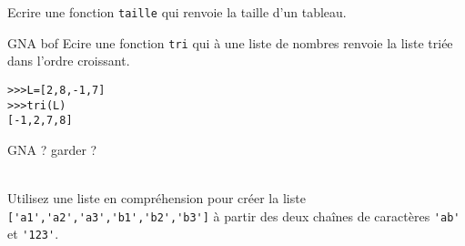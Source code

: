 \begin{exercice}
Ecrire une fonction \verb?taille? qui renvoie la taille d'un tableau.
\end{exercice}



\begin{exercice}GNA bof
Ecire une fonction \verb?tri? qui \` a une liste de nombres renvoie la liste triée dans l'ordre croissant.
\begin{verbatim}
>>>L=[2,8,-1,7]
>>>tri(L)
[-1,2,7,8]
\end{verbatim}

\end{exercice}



GNA ? garder ?
\begin{exercice}~\\
Utilisez une liste en compréhension pour créer la liste \verb?['a1','a2','a3','b1','b2','b3']? \` a partir des deux cha\^ ines de caract\` eres \verb?'ab'? et \verb?'123'?.
\end{exercice}

